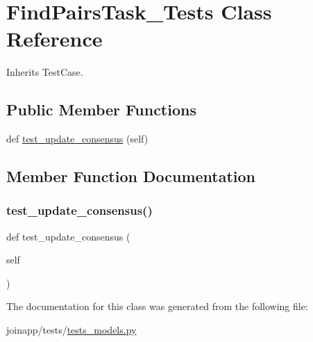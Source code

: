\hypertarget{classtests__models_1_1_find_pairs_task___tests}{}\section{Find\+Pairs\+Task\+\_\+\+Tests Class Reference}
\label{classtests__models_1_1_find_pairs_task___tests}


Inherits Test\+Case.

\subsection*{Public Member Functions}
\begin{DoxyCompactItemize}
\item 
def \mbox{\hyperlink{classtests__models_1_1_find_pairs_task___tests_a42549850130eb7841e5ca9614e2b4c5a}{test\+\_\+update\+\_\+consensus}} (self)
\end{DoxyCompactItemize}


\subsection{Member Function Documentation}
\mbox{\label{classtests__models_1_1_find_pairs_task___tests_a42549850130eb7841e5ca9614e2b4c5a}} 
\subsubsection{\texorpdfstring{test\_update\_consensus()}{test\_update\_consensus()}}
{\footnotesize\ttfamily def test\+\_\+update\+\_\+consensus (\begin{DoxyParamCaption}\item[{}]{self }\end{DoxyParamCaption})}



The documentation for this class was generated from the following file\+:\begin{DoxyCompactItemize}
\item 
joinapp/tests/\mbox{\hyperlink{tests__models_8py}{tests\+\_\+models.\+py}}\end{DoxyCompactItemize}
